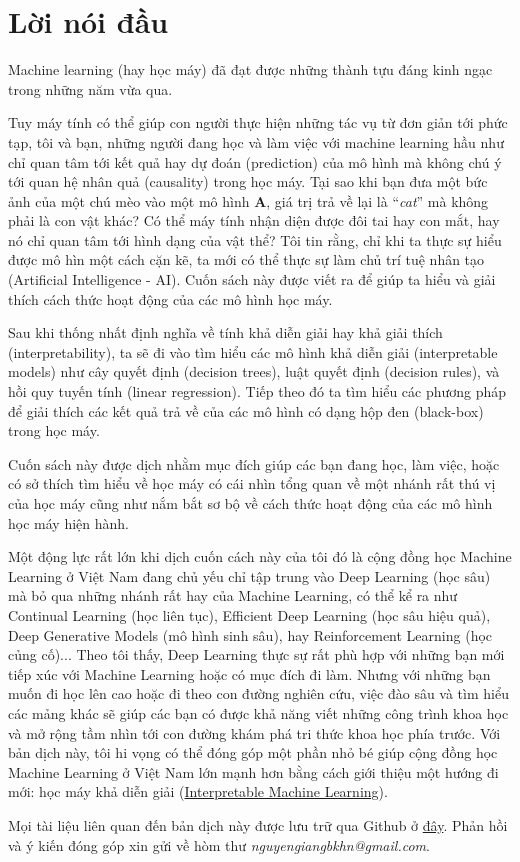 \chapter*{Lời nói đầu}
Machine learning (hay học máy) đã đạt được những thành tựu đáng kinh ngạc trong những năm vừa qua. 

Tuy máy tính có thể giúp con người thực hiện những tác vụ từ đơn giản tới phức tạp, tôi và bạn, những người đang học và làm việc với machine learning hầu như chỉ quan tâm tới kết quả hay dự đoán (prediction) của mô hình mà không chú ý tới quan hệ nhân quả (causality) trong học máy. Tại sao khi bạn đưa một bức ảnh của một chú mèo vào một mô hình \textbf{A}, giá trị trả về lại là ``\textit{cat}'' mà không phải là con vật khác? Có thể máy tính nhận diện được đôi tai hay con mắt, hay nó chỉ quan tâm tới hình dạng của vật thể? Tôi tin rằng, chỉ khi ta thực sự hiểu được mô hìn một cách cặn kẽ, ta mới có thể thực sự làm chủ trí tuệ nhân tạo (Artificial Intelligence - AI). Cuốn sách này được viết ra để giúp ta hiểu và giải thích cách thức hoạt động của các mô hình học máy.

Sau khi thống nhất định nghĩa về tính khả diễn giải hay khả giải thích (interpretability), ta sẽ đi vào tìm hiểu các mô hình khả diễn giải (interpretable models) như cây quyết định (decision trees), luật quyết định (decision rules), và hồi quy tuyến tính (linear regression). Tiếp theo đó ta tìm hiểu các phương pháp để giải thích các kết quả trả về của các mô hình có dạng hộp đen (black-box) trong học máy.

Cuốn sách này được dịch nhằm mục đích giúp các bạn đang học, làm việc, hoặc có sở thích tìm hiểu về học máy có cái nhìn tổng quan về một nhánh rất thú vị của học máy cũng như nắm bắt sơ bộ về cách thức hoạt động của các mô hình học máy hiện hành.  

Một động lực rất lớn khi dịch cuốn cách này của tôi đó là cộng đồng học Machine Learning ở Việt Nam đang chủ yếu chỉ tập trung vào Deep Learning (học sâu) mà bỏ qua những nhánh rất hay của Machine Learning, có thể kể ra như Continual Learning (học liên tục), Efficient Deep Learning (học sâu hiệu quả), Deep Generative Models (mô hình sinh sâu), hay Reinforcement Learning (học củng cố)... Theo tôi thấy, Deep Learning thực sự rất phù hợp với những bạn mới tiếp xúc với Machine Learning hoặc có mục đích đi làm. Nhưng với những bạn muốn đi học lên cao hoặc đi theo con đường nghiên cứu, việc đào sâu và tìm hiểu các mảng khác sẽ giúp các bạn có được khả năng viết những công trình khoa học và mở rộng tầm nhìn tới con đường khám phá tri thức khoa học phía trước. Với bản dịch này, tôi hi vọng có thể đóng góp một phần nhỏ bé giúp cộng đồng học Machine Learning ở Việt Nam lớn mạnh hơn bằng cách giới thiệu một hướng đi mới: học máy khả diễn giải (\href{https://christophm.github.io/interpretable-ml-book/}{Interpretable Machine Learning}). 

Mọi tài liệu liên quan đến bản dịch này được lưu trữ qua Github ở \href{https://github.com/giangnguyen2412/InterpretableMLBook-Vietnamese}{đây}. Phản hồi và ý kiến đóng góp xin gửi về hòm thư \textit{nguyengiangbkhn@gmail.com}.

